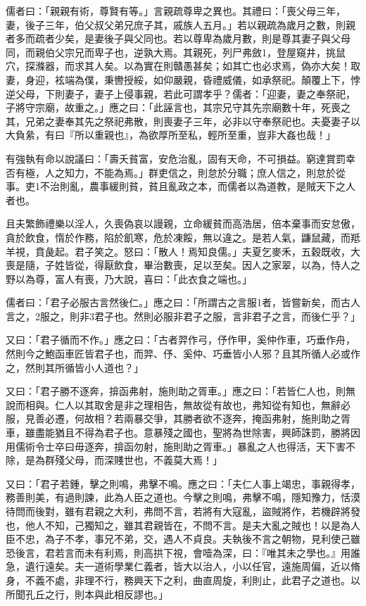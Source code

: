 
\begin{pinyinscope}
儒者曰：「親親有術，尊賢有等。」言親疏尊卑之異也。其禮曰：「喪父母三年，妻，後子三年，伯父叔父弟兄庶子其，戚族人五月。」若以親疏為歲月之數，則親者多而疏者少矣，是妻後子與父同也。若以尊卑為歲月數，則是尊其妻子與父母同，而親伯父宗兄而卑子也，逆孰大焉。其親死，列尸弗斂1，登屋窺井，挑鼠穴，探滌器，而求其人矣。以為實在則贛愚甚矣；如其亡也必求焉，偽亦大矣！取妻，身迎，袨端為僕，秉轡授綏，如仰嚴親，昏禮威儀，如承祭祀。顛覆上下，悖逆父母，下則妻子，妻子上侵事親，若此可謂孝乎？儒者：「迎妻，妻之奉祭祀，子將守宗廟，故重之。」應之曰：「此誣言也，其宗兄守其先宗廟數十年，死喪之其，兄弟之妻奉其先之祭祀弗散，則喪妻子三年，必非以守奉祭祀也。夫憂妻子以大負絫，有曰『所以重親也』，為欲厚所至私，輕所至重，豈非大姦也哉！」

有強執有命以說議曰：「壽夭貧富，安危治亂，固有天命，不可損益。窮達賞罰幸否有極，人之知力，不能為焉。」群吏信之，則怠於分職；庶人信之，則怠於從事。吏1不治則亂，農事緩則貧，貧且亂政之本，而儒者以為道教，是賊天下之人者也。

且夫繁飾禮樂以淫人，久喪偽哀以謾親，立命緩貧而高浩居，倍本棄事而安怠傲，貪於飲食，惰於作務，陷於飢寒，危於凍餒，無以違之。是若人氣，鼸鼠藏，而羝羊視，賁彘起。君子笑之。怒曰：「散人！焉知良儒。」夫夏乞麥禾，五穀既收，大喪是隨，子姓皆從，得厭飲食，畢治數喪，足以至矣。因人之家翠，以為，恃人之野以為尊，富人有喪，乃大說，喜曰：「此衣食之端也。」

儒者曰：「君子必服古言然後仁。」應之曰：「所謂古之言服1者，皆嘗新矣，而古人言之，2服之，則非3君子也。然則必服非君子之服，言非君子之言，而後仁乎？」

又曰：「君子循而不作。」應之曰：「古者羿作弓，伃作甲，奚仲作車，巧垂作舟，然則今之鮑函車匠皆君子也，而羿、伃、奚仲、巧垂皆小人邪？且其所循人必或作之，然則其所循皆小人道也？」

又曰：「君子勝不逐奔，揜函弗射，施則助之胥車。」應之曰：「若皆仁人也，則無說而相與。仁人以其取舍是非之理相告，無故從有故也，弗知從有知也，無辭必服，見善必遷，何故相？若兩暴交爭，其勝者欲不逐奔，掩函弗射，施則助之胥車，雖盡能猶且不得為君子也。意暴殘之國也，聖將為世除害，興師誅罰，勝將因用儒術令士卒曰毋逐奔，揜函勿射，施則助之胥車。」暴亂之人也得活，天下害不除，是為群殘父母，而深賤世也，不義莫大焉！」

又曰：「君子若鍾，擊之則鳴，弗擊不鳴。應之曰：「夫仁人事上竭忠，事親得孝，務善則美，有過則諫，此為人臣之道也。今擊之則鳴，弗擊不鳴，隱知豫力，恬漠待問而後對，雖有君親之大利，弗問不言，若將有大寇亂，盜賊將作，若機辟將發也，他人不知，己獨知之，雖其君親皆在，不問不言。是夫大亂之賊也！以是為人臣不忠，為子不孝，事兄不弟，交，遇人不貞良。夫執後不言之朝物，見利使己雖恐後言，君若言而未有利焉，則高拱下視，會噎為深，曰：『唯其未之學也。』用誰急，遺行遠矣。夫一道術學業仁義者，皆大以治人，小以任官，遠施周偏，近以脩身，不義不處，非理不行，務興天下之利，曲直周旋，利則止，此君子之道也。以所聞孔丘之行，則本與此相反謬也。」


\end{pinyinscope}
